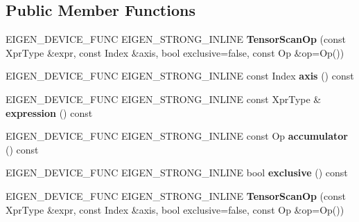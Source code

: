 \subsection*{Public Member Functions}
\begin{DoxyCompactItemize}
\item 
\mbox{\label{class_eigen_1_1_tensor_scan_op_a9d0da3b1613efca99fe444c1c4c4f50d}} 
E\+I\+G\+E\+N\+\_\+\+D\+E\+V\+I\+C\+E\+\_\+\+F\+U\+NC E\+I\+G\+E\+N\+\_\+\+S\+T\+R\+O\+N\+G\+\_\+\+I\+N\+L\+I\+NE {\bfseries Tensor\+Scan\+Op} (const Xpr\+Type \&expr, const Index \&axis, bool exclusive=false, const Op \&op=Op())
\item 
\mbox{\label{class_eigen_1_1_tensor_scan_op_a209aa8763594b81f44a4b263cb95558c}} 
E\+I\+G\+E\+N\+\_\+\+D\+E\+V\+I\+C\+E\+\_\+\+F\+U\+NC E\+I\+G\+E\+N\+\_\+\+S\+T\+R\+O\+N\+G\+\_\+\+I\+N\+L\+I\+NE const Index {\bfseries axis} () const
\item 
\mbox{\label{class_eigen_1_1_tensor_scan_op_ab48bdf85f90d2041b04aa2d25cd41420}} 
E\+I\+G\+E\+N\+\_\+\+D\+E\+V\+I\+C\+E\+\_\+\+F\+U\+NC E\+I\+G\+E\+N\+\_\+\+S\+T\+R\+O\+N\+G\+\_\+\+I\+N\+L\+I\+NE const Xpr\+Type \& {\bfseries expression} () const
\item 
\mbox{\label{class_eigen_1_1_tensor_scan_op_a80a4a65581f606441a65842681536b19}} 
E\+I\+G\+E\+N\+\_\+\+D\+E\+V\+I\+C\+E\+\_\+\+F\+U\+NC E\+I\+G\+E\+N\+\_\+\+S\+T\+R\+O\+N\+G\+\_\+\+I\+N\+L\+I\+NE const Op {\bfseries accumulator} () const
\item 
\mbox{\label{class_eigen_1_1_tensor_scan_op_a8d3a0a38b3835e8644ed2f68a852e6c8}} 
E\+I\+G\+E\+N\+\_\+\+D\+E\+V\+I\+C\+E\+\_\+\+F\+U\+NC E\+I\+G\+E\+N\+\_\+\+S\+T\+R\+O\+N\+G\+\_\+\+I\+N\+L\+I\+NE bool {\bfseries exclusive} () const
\item 
\mbox{\label{class_eigen_1_1_tensor_scan_op_a9d0da3b1613efca99fe444c1c4c4f50d}} 
E\+I\+G\+E\+N\+\_\+\+D\+E\+V\+I\+C\+E\+\_\+\+F\+U\+NC E\+I\+G\+E\+N\+\_\+\+S\+T\+R\+O\+N\+G\+\_\+\+I\+N\+L\+I\+NE {\bfseries Tensor\+Scan\+Op} (const Xpr\+Type \&expr, const Index \&axis, bool exclusive=false, const Op \&op=Op())
\item 

\end{DoxyCompactItemize}
